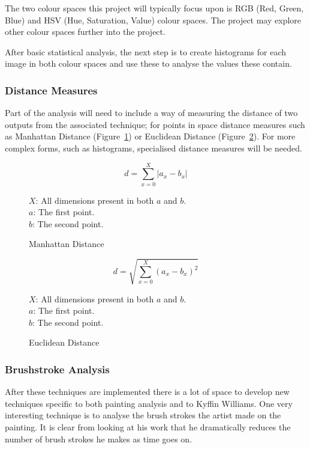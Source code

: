 \documentclass[11pt,fleqn,twoside]{article}
\begin{document}
The two colour spaces this project will typically focus upon is RGB (Red, Green, Blue) and HSV
(Hue, Saturation, Value) colour spaces. The project may explore other colour spaces further into 
the project.

After basic statistical analysis, the next step is to create histograms for each image in both 
colour spaces and use these to analyse the values these contain.

\subsubsection{Distance Measures}
Part of the analysis will need to include a way of measuring the distance of two outputs from the
associated technique; for points in space distance measures such as Manhattan Distance 
(Figure~\ref{eq:manhattan}) or Euclidean Distance (Figure~\ref{eq:euclidean}). For more complex
forms, such as histograms, specialised distance measures will be needed.

\begin{figure}[p]
\[
d = \sum^X_{x=0}{|a_x - b_x|}
\]

\(X\): All dimensions present in both \(a\) and \(b\).\\
\(a\): The first point.\\
\(b\): The second point.

\caption{Manhattan Distance}
\label{eq:manhattan}
\end{figure}

\begin{figure}[p]
\[
d = \sqrt{\sum^X_{x=0}{(a_x - b_x)^2}}
\]

\(X\): All dimensions present in both \(a\) and \(b\).\\
\(a\): The first point.\\
\(b\): The second point.
\caption{Euclidean Distance}
\label{eq:euclidean}
\end{figure}

\subsubsection{Brushstroke Analysis}
After these techniques are implemented there is a lot of space to develop new techniques specific 
to both painting analysis and to Kyffin Williams. One very interesting technique is to analyse the
brush strokes the artist made on the painting. It is clear from looking at his work that he 
dramatically reduces the number of brush strokes he makes as time goes on. 
\end{document}
